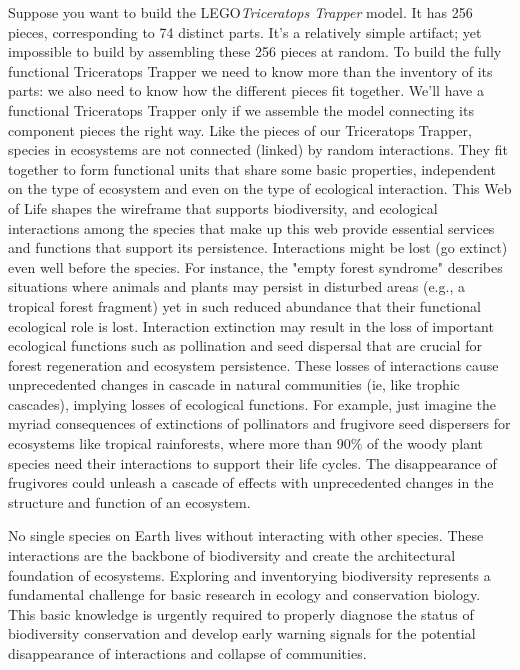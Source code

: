 \documentclass[10pt,letterpaper]{article}
\begin{document}
Suppose you want to build the LEGO\circledR \textit{Triceratops Trapper} model. It has 256 pieces, corresponding to 74 distinct parts. It's a relatively simple artifact; yet impossible to build by assembling these 256 pieces at random. To build the fully functional Triceratops Trapper we need to know more than the inventory of its parts: we also need to know how the different pieces fit together. We'll have a functional Triceratops Trapper only if we assemble the model connecting its component pieces the right way. Like the pieces of our Triceratops Trapper, species in ecosystems are not connected (linked) by random interactions. They fit together to form functional units that share some basic properties, independent on the type of ecosystem and even on the type of ecological interaction. This Web of Life \cite{Thompson:2009} shapes the wireframe that supports biodiversity, and ecological interactions among the species that make up this web provide essential services and functions that support its persistence. Interactions might be lost (go extinct) even well before the species. For instance, the "empty forest syndrome" \cite{Redford:1992} describes situations where animals and plants may persist in disturbed areas (e.g., a tropical forest fragment) yet in such reduced abundance that their functional ecological role is lost. Interaction extinction may result in the loss of important ecological functions such as pollination and seed dispersal that are crucial for forest regeneration and ecosystem persistence. These losses of interactions cause unprecedented changes in cascade in natural communities (ie, like trophic cascades), implying losses of ecological functions. For example, just imagine the myriad consequences of extinctions of pollinators and frugivore seed dispersers for ecosystems like tropical rainforests, where more than 90\% of the woody plant species need their interactions to support their life cycles. The disappearance of frugivores could unleash a cascade of effects with unprecedented changes in the structure and function of an ecosystem.

No single species on Earth lives without interacting with other species. These interactions are the backbone of biodiversity and create the architectural foundation of ecosystems. Exploring and inventorying biodiversity represents a fundamental challenge for basic research in ecology and conservation biology. This basic knowledge is urgently required to properly diagnose the status of biodiversity conservation and develop early warning signals for the potential disappearance of interactions and collapse of communities.    
\end{document}
